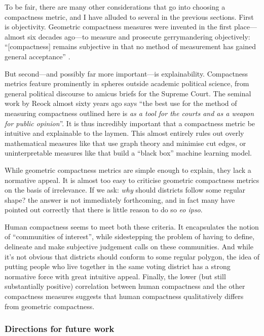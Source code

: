 \documentclass[]{article}
\begin{document}
To be fair, there are many other considerations that go into choosing a
compactness metric, and I have alluded to several in the previous
sections. First is objectivity. Geometric compactness measures were
invented in the first place---almost six decades ago---to measure and
prosecute gerrymandering objectively: ``{[}compactness{]} remains
subjective in that no method of measurement has gained general
acceptance'' \citep[p.~74]{reock1961}.

But second---and possibly far more important---is explainability.
Compactness metrics feature prominently in spheres outside academic
political science, from general political discourse to amicus briefs for
the Supreme Court. The seminal work by Reock almost sixty years ago says
``the best use for the method of measuring compactness outlined here is
\emph{as a tool for the courts and as a weapon for public opinion}''. It
is thus incredibly important that a compactness metric be intuitive and
explainable to the laymen. This almost entirely rules out overly
mathematical measures like \cite{dc2016} that use graph theory and
minimise cut edges, or uninterpretable measures like \cite{kingwp} that
build a ``black box'' machine learning model.

While geometric compactness metrics are simple enough to explain, they
lack a normative appeal. It is almost too easy to criticise geometric
compactness metrics on the basis of irrelevance. If we ask: \emph{why}
should districts follow some regular shape? the answer is not
immediately forthcoming, and in fact many have pointed out correctly
that there is little reason to do so \emph{eo ipso}.

Human compactness seems to meet both these criteria. It encapsulates the
notion of ``communities of interest'', while sidestepping the problem of
having to define, delineate and make subjective judgement calls on these
communities. And while it's not obvious that districts should conform to
some regular polygon, the idea of putting people who live together in
the same voting district has a strong normative force with great
intuitive appeal. Finally, the lower (but still substantially positive)
correlation between human compactness and the other compactness measures
suggests that human compactness qualitatively differs from geometric
compactness.

\hypertarget{directions-for-future-work}{%
\subsubsection{Directions for future
work}\label{directions-for-future-work}}
\end{document}
